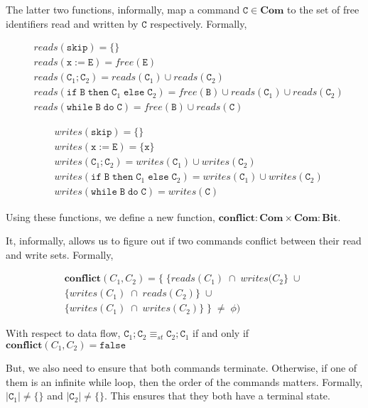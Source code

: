 \documentclass[a4paper,10pt]{article}
\newcommand{\E}{\mathtt{E}}
\newcommand{\B}{\mathtt{B}}
\newcommand{\C}{\mathtt{C}}
\newcommand{\false}{\mathtt{false}}
\newcommand{\ifsym}{\mathtt{if}}
\newcommand{\then}{\mathtt{then}}
\newcommand{\elsesym}{\mathtt{else}}
\newcommand{\whilesym}{\mathtt{while}}
\newcommand{\dosym}{\mathtt{do}}
\newcommand{\skipsym}{\mathtt{skip}}
\begin{document}
\begin{enumerate}
The latter two functions, informally, map a command $\C \in \textbf{Com}$ to the
set of free identifiers read and written by $\C$ respectively. Formally,

\begin{align*}
& reads(\skipsym) = \{\} \\
& reads(\mathtt{x} := \E) = free(\E) \\
& reads(\C_{1}; \C_{2}) = reads(\C_{1}) \cup reads(\C_{2}) \\
& reads(\ifsym \; \B \; \then \; \C_{1} \; \elsesym \; \C_{2}) = free(\B) \cup
reads(\C_{1}) \cup reads(\C_{2}) \\
& reads(\whilesym \; \B \; \dosym \; \C) = free(\B) \cup reads(\C)
\end{align*}

\begin{align*}
& writes(\skipsym) = \{\} \\
& writes(\mathtt{x} := \E) = \{\mathtt{x}\} \\
& writes(\C_{1}; \C_{2}) = writes(\C_{1}) \cup writes(\C_{2}) \\
& writes(\ifsym \; \B \; \then \; \C_{1} \; \elsesym \; \C_{2}) = 
writes(\C_{1}) \cup writes(\C_{2}) \\
& writes(\whilesym \; \B \; \dosym \; \C) = writes(\C)
\end{align*}  
  
Using these functions, we define a new function,  
$\textbf{conflict} : \textbf{Com} \times \textbf{Com} : \textbf{Bit}$.

It, informally, allows us to figure out if two commands conflict between their
read and write sets. Formally,
 
\begin{align*}
\textbf{conflict}(C_{1}, C_{2}) =
\{ \; \{ reads(C_{1}) \; \cap \; writes(C_{2} \} \; \cup \; \\
\{ writes(C_{1}) \; \cap \; reads(C_{2}) \} \; \cup \; \\
\{ writes(C_{1}) \; \cap \; writes(C_{2})\} \; \} \; \neq \; \phi)
\end{align*}  
  
With respect to data flow, $\C_1 ; \C_2 \equiv_{st} \C_2 ; \C_1$
if and only if $ \textbf{conflict}(C_{1}, C_{2}) = \false $

But, we also need to ensure that both commands terminate. Otherwise, if 
one of them is an infinite while loop, then the order of the commands
matters. Formally, $|\C_1| \neq \{\} $ and  $|\C_2| \neq \{\} $.
This ensures that they both have a terminal state.



\end{enumerate}
\end{document}
